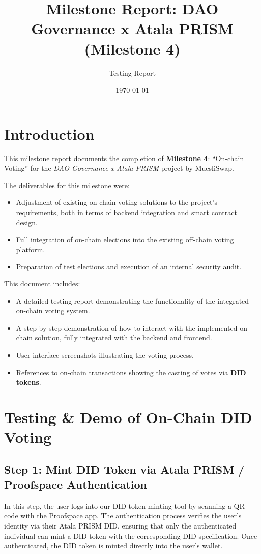 \documentclass{article}
\title{Milestone Report: DAO Governance x Atala PRISM\\(Milestone 4)}
\author{Testing Report}
\date{\today}
\begin{document}
\maketitle

\vspace{8em}

\tableofcontents

\newpage

\section{Introduction}
This milestone report documents the completion of \textbf{Milestone 4}: ``On-chain Voting'' for the \textit{DAO Governance x Atala PRISM} project by MuesliSwap.

The deliverables for this milestone were:
\begin{itemize}
    \item Adjustment of existing on-chain voting solutions to the project's requirements, both in terms of backend integration and smart contract design.
    \item Full integration of on-chain elections into the existing off-chain voting platform.
    \item Preparation of test elections and execution of an internal security audit.
\end{itemize}

This document includes:
\begin{itemize}
    \item A detailed testing report demonstrating the functionality of the integrated on-chain voting system.
    \item A step-by-step demonstration of how to interact with the implemented on-chain solution, fully integrated with the backend and frontend.
    \item User interface screenshots illustrating the voting process.
    \item References to on-chain transactions showing the casting of votes via \textbf{DID tokens}.
\end{itemize}



\section{Testing \& Demo of On-Chain DID Voting}

\subsection{Step 1: Mint DID Token via Atala PRISM / Proofspace Authentication}
In this step, the user logs into our DID token minting tool by scanning a QR code with the Proofspace app.  
The authentication process verifies the user's identity via their Atala PRISM DID, ensuring that only the authenticated individual can mint a DID token with the corresponding DID specification.  
Once authenticated, the DID token is minted directly into the user's wallet.
\end{document}

